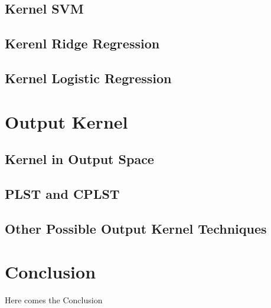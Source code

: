 \documentclass[12pt]{article}
\begin{document}
\subsection{Kernel SVM}
\subsection{Kerenl Ridge Regression}
\subsection{Kernel Logistic Regression}

\section{Output Kernel}
\subsection{Kernel in Output Space}
\subsection{PLST and CPLST}
\subsection{Other Possible Output Kernel Techniques}

\section{Conclusion}
Here comes the Conclusion






\end{document}
